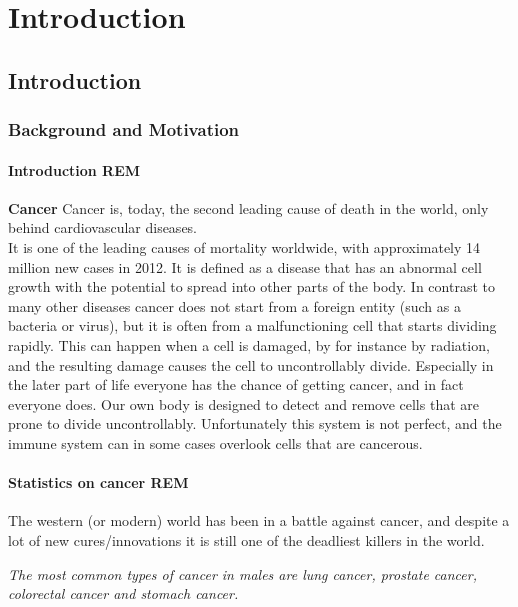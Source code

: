 \part{Introduction}
\chapter{Introduction}
	\section{Background and Motivation}
	\subsection{Introduction REM}
	\textbf{Cancer}
	Cancer is, today, the second leading cause of death in the world, only behind cardiovascular diseases.\\  %
	It is one of the leading causes of mortality worldwide, with approximately 14 million new cases in 2012. %
	It is defined as a disease that has an abnormal cell growth with the potential to spread into other parts of the body.%
	In contrast to many other diseases cancer does not start from a foreign entity (such as a bacteria or virus), but it is often from a malfunctioning cell that starts dividing rapidly. 
	This can happen when a cell is damaged, by for instance by radiation, and the resulting damage causes the cell to uncontrollably divide. 
	Especially in the later part of life everyone has the chance of getting cancer, and in fact everyone does. Our own body is designed to detect and remove cells that are prone
	to divide uncontrollably. Unfortunately this system is not perfect, and the immune system can in some cases overlook cells that are cancerous.
	
	
	
	\vspace{10px}
	
	\subsection{Statistics on cancer REM}
	The western (or modern) world has been in a battle against cancer, and despite a 
	lot of new cures/innovations it is still one of the deadliest killers in the world. 

	
	\textit{The most common types of cancer in males are lung cancer, prostate cancer, colorectal cancer and stomach cancer.\cite{stewart2014world}}
	
